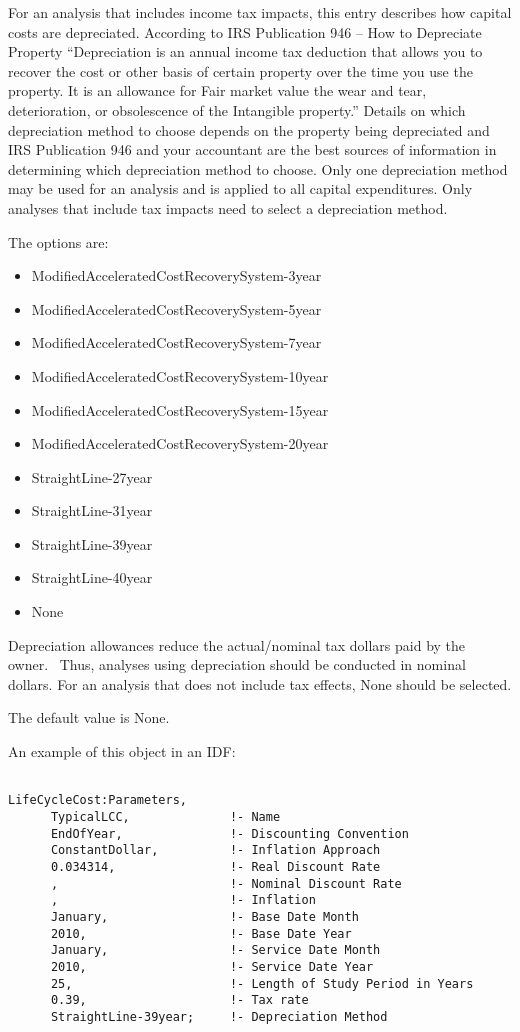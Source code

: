 For an analysis that includes income tax impacts, this entry describes how capital costs are depreciated. According to IRS Publication 946 -- How to Depreciate Property ``Depreciation is an annual income tax deduction that allows you to recover the cost or other basis of certain property over the time you use the property. It is an allowance for Fair market value the wear and tear, deterioration, or obsolescence of the Intangible property.'' Details on which depreciation method to choose depends on the property being depreciated and IRS Publication 946 and your accountant are the best sources of information in determining which depreciation method to choose. Only one depreciation method may be used for an analysis and is applied to all capital expenditures. Only analyses that include tax impacts need to select a depreciation method.

The options are:

\begin{itemize}
\item
  ModifiedAcceleratedCostRecoverySystem-3year
\item
  ModifiedAcceleratedCostRecoverySystem-5year
\item
  ModifiedAcceleratedCostRecoverySystem-7year
\item
  ModifiedAcceleratedCostRecoverySystem-10year
\item
  ModifiedAcceleratedCostRecoverySystem-15year
\item
  ModifiedAcceleratedCostRecoverySystem-20year
\item
  StraightLine-27year
\item
  StraightLine-31year
\item
  StraightLine-39year
\item
  StraightLine-40year
\item
  None
\end{itemize}

Depreciation allowances reduce the actual/nominal tax dollars paid by the owner.~ Thus, analyses using depreciation should be conducted in nominal dollars. For an analysis that does not include tax effects, None should be selected.

The default value is None.

An example of this object in an IDF:

\begin{lstlisting}

LifeCycleCost:Parameters,
      TypicalLCC,              !- Name
      EndOfYear,               !- Discounting Convention
      ConstantDollar,          !- Inflation Approach
      0.034314,                !- Real Discount Rate
      ,                        !- Nominal Discount Rate
      ,                        !- Inflation
      January,                 !- Base Date Month
      2010,                    !- Base Date Year
      January,                 !- Service Date Month
      2010,                    !- Service Date Year
      25,                      !- Length of Study Period in Years
      0.39,                    !- Tax rate
      StraightLine-39year;     !- Depreciation Method
\end{lstlisting}
